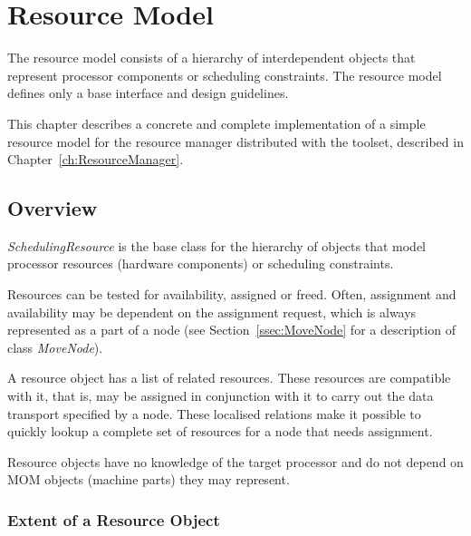 \documentclass[a4paper,twoside]{tce}
\begin{document}




\chapter{Resource Model}

The resource model consists of a hierarchy of interdependent objects that
represent processor components or scheduling constraints. The resource model
defines only a base interface and design guidelines.

This chapter describes a concrete and complete implementation of a simple
resource model for the resource manager distributed with the toolset,
described in Chapter~\ref{ch:ResourceManager}.

\section{Overview}

\emph{SchedulingResource} is the base class for the hierarchy of objects
that model processor resources (hardware components) or scheduling
constraints.

Resources can be tested for availability, assigned or freed. Often,
assignment and availability may be dependent on the assignment request,
which is always represented as a part of a node (see
Section~\ref{ssec:MoveNode} for a description of class \emph{MoveNode}).

A resource object has a list of related resources. These resources are
compatible with it, that is, may be assigned in conjunction with it to carry
out the data transport specified by a node. These localised relations make
it possible to quickly lookup a complete set of resources for a node that
needs assignment.

Resource objects have no knowledge of the target processor and do not depend
on MOM objects (machine parts) they may represent.

\subsection{Extent of a Resource Object}
\label{ssec:resource-extent}
\end{document}
